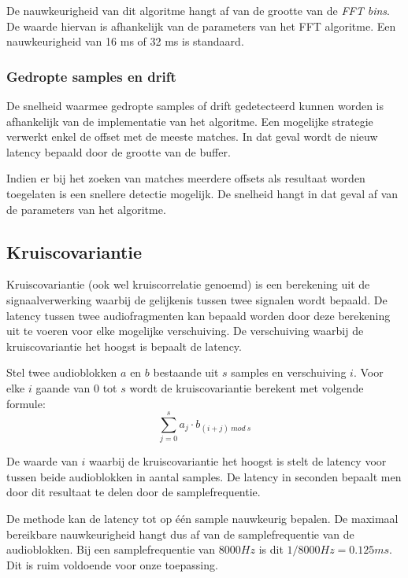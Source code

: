 De nauwkeurigheid van dit algoritme hangt af van de grootte van de \textit{FFT bins}. De waarde hiervan is afhankelijk van de parameters van het FFT algoritme. Een nauwkeurigheid van 16 ms of 32 ms is standaard.

\subsubsection{Gedropte samples en drift}

De snelheid waarmee gedropte samples of drift gedetecteerd kunnen worden is afhankelijk van de implementatie van het algoritme. Een mogelijke strategie verwerkt enkel de offset met de meeste matches. In dat geval wordt de nieuw latency bepaald door de grootte van de buffer. 

Indien er bij het zoeken van matches meerdere offsets als resultaat worden toegelaten is een snellere detectie mogelijk. De snelheid hangt in dat geval af van de parameters van het algoritme.

\subsection{Kruiscovariantie}

Kruiscovariantie (ook wel kruiscorrelatie genoemd) is een berekening uit de signaalverwerking waarbij de gelijkenis tussen twee signalen wordt bepaald. De latency tussen twee audiofragmenten kan bepaald worden door deze berekening uit te voeren voor elke mogelijke verschuiving. De verschuiving waarbij de kruiscovariantie het hoogst is bepaalt de latency.

Stel twee audioblokken $ a $ en $ b $ bestaande uit $ s $ samples en verschuiving $ i $. Voor elke $ i $ gaande van 0 tot $ s $ wordt de kruiscovariantie berekent met volgende formule:
\begin{equation}
 \sum_{j=0}^{s} a_{j} \cdot b_{(i+j)\ mod\ s}
\end{equation}

De waarde van $ i $ waarbij de kruiscovariantie het hoogst is stelt de latency voor tussen beide audioblokken in aantal samples. De latency in seconden bepaalt men door dit resultaat te delen door de samplefrequentie.

De methode kan de latency tot op één sample nauwkeurig bepalen. De maximaal bereikbare nauwkeurigheid hangt dus af van de samplefrequentie van de audioblokken. Bij een samplefrequentie van $8000 Hz$ is dit $ 1/8000 Hz = 0.125 ms $. Dit is ruim voldoende voor onze toepassing.

